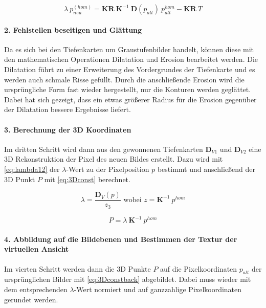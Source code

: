 \begin{equation}
\label{eq:forwardwarp}
\lambda \: p_{neu}^{(hom)} = \boldsymbol{K} \boldsymbol{R} \: \boldsymbol{K}^{-1} \: \boldsymbol{D}(p_{alt}) \: p_{alt}^{hom} - \boldsymbol{K} \boldsymbol{R} \: T
\end{equation}

\paragraph{2. Fehlstellen beseitigen und Glättung}

Da es sich bei den Tiefenkarten um Graustufenbilder handelt, können diese mit den mathematischen Operationen Dilatation und Erosion bearbeitet werden. Die Dilatation führt zu einer Erweiterung des Vordergrundes der Tiefenkarte und es werden auch schmale Risse gefüllt. Durch die anschließende Erosion wird die ursprüngliche Form fast wieder hergestellt, nur die Konturen werden geglättet. Dabei hat sich gezeigt, dass ein etwas größerer Radius für die Erosion gegenüber der Dilatation bessere Ergebnisse liefert.

\paragraph{3. Berechnung der 3D Koordinaten}

Im dritten Schritt wird dann aus den gewonnenen Tiefenkarten $\boldsymbol{D}_{V1}$ und $\boldsymbol{D}_{V2}$ eine 3D Rekonstruktion der Pixel des neuen Bildes erstellt. Dazu wird mit \ref{eq:lambda12} der $\lambda$-Wert zu der Pixelposition $p$ bestimmt und anschließend der 3D Punkt $P$ mit \ref{eq:3Dconst} berechnet.

\begin{equation}
\label{eq:lambda12}
\lambda = \frac{\boldsymbol{D}_V(p)}{z_3} \text{ wobei } z = \boldsymbol{K}^{-1} \: p^{hom}
\end{equation}

\begin{equation}
\label{eq:3Dconst}
P = \lambda \: \boldsymbol{K}^{-1} \: p^{hom}
\end{equation}

\paragraph{4. Abbildung auf die Bildebenen und Bestimmen der Textur der virtuellen Ansicht}

Im vierten Schritt werden dann die 3D Punkte $P$ auf die Pixelkoordinaten $p_{alt}$ der ursprünglichen Bilder mit \ref{eq:3Dconstback} abgebildet. Dabei muss wieder mit dem entsprechenden $\lambda$-Wert normiert und auf ganzzahlige Pixelkoordinaten gerundet werden.

